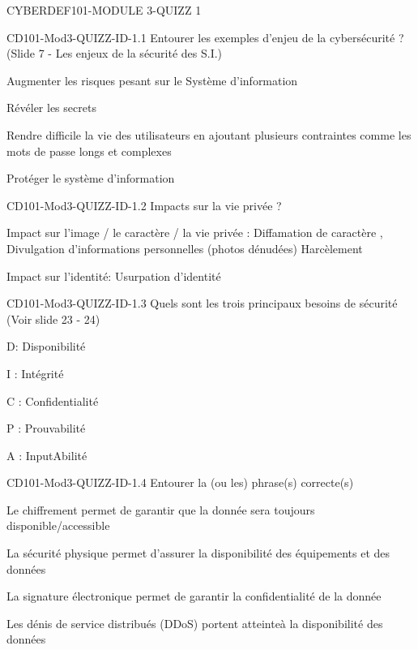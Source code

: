 \documentclass[12pt]{article}
\begin{document}
   \begin{quiz}{CYBERDEF101-MODULE 3-QUIZZ 1}


\begin{multi}[multiple=true]{CD101-Mod3-QUIZZ-ID-1.1}
	Entourer les exemples d'enjeu de la cybers\'ecurit\'e ? (Slide 7 - Les enjeux de la s\'ecurit\'e des S.I.)
\item 	Augmenter les risques pesant sur le Syst\`eme d'information
\item 	R\'ev\'eler les secrets
\item	Rendre difficile la vie des utilisateurs en ajoutant plusieurs contraintes comme les mots de passe longs et complexes
\item* 	Prot\'eger le syst\`eme d'information
\end{multi}

\begin{multi}[multiple=true]{CD101-Mod3-QUIZZ-ID-1.2}
	Impacts sur la vie priv\'ee  ?
\item* 	Impact sur l'image / le caract\`ere / la vie priv\'ee : Diffamation de caract\`ere , Divulgation d'informations personnelles (photos d\'enud\'ees) Harc\`element
\item*	Impact sur l'identit\'e: Usurpation d'identit\'e
 \end{multi}

\begin{multi}[multiple=true]{CD101-Mod3-QUIZZ-ID-1.3}
	Quels sont les trois principaux besoins de s\'ecurit\'e (Voir slide 23 - 24)
\item* 	D: Disponibilit\'e
\item* 	I : Int\'egrit\'e
\item*	C : Confidentialit\'e
\item  P : Prouvabilit\'e
\item  A : InputAbilit\'e
\end{multi}


\begin{multi}[multiple=true]{CD101-Mod3-QUIZZ-ID-1.4}
	Entourer la (ou les) phrase(s) correcte(s)
\item 	Le chiffrement permet de garantir que la donn\'ee sera toujours disponible/accessible
\item* 	La s\'ecurit\'e physique permet d'assurer la disponibilit\'e des \'equipements et des donn\'ees
\item 	La signature \'electronique permet de garantir la confidentialit\'e de la donn\'ee
\item*	Les d\'enis de service distribu\'es (DDoS) portent atteinte\`a la disponibilit\'e des donn\'ees
\end{multi}




\end{quiz}
\end{document}
